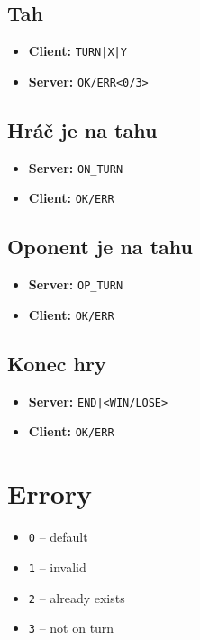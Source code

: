 \documentclass[11pt,a4paper]{article}
\begin{document}
\subsection{Tah}
\begin{itemize}
	\item \textbf{Client:} \texttt{TURN|X|Y}
	\item \textbf{Server:} \texttt{OK/ERR<0/3>}
\end{itemize}

\subsection{Hráč je na tahu}
\begin{itemize}
	\item \textbf{Server:} \texttt{ON\_TURN}
	\item \textbf{Client:} \texttt{OK/ERR}
\end{itemize}

\subsection{Oponent je na tahu}
\begin{itemize}
	\item \textbf{Server:} \texttt{OP\_TURN}
	\item \textbf{Client:} \texttt{OK/ERR}

\end{itemize}

\subsection{Konec hry}
\begin{itemize}
	\item \textbf{Server:} \texttt{END|<WIN/LOSE>}
	\item \textbf{Client:} \texttt{OK/ERR}
\end{itemize}

\section{Errory}
\begin{itemize}
	\item \texttt{0} -- default
	\item \texttt{1} -- invalid
	\item \texttt{2} -- already exists
	\item \texttt{3} -- not on turn
\end{itemize}
\end{document}
